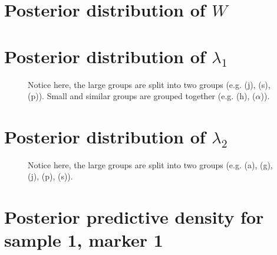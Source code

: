 \documentclass[10pt]{article} %
\begin{document}
\newpage
\section{Posterior distribution of $W$}
\begin{figure}[H]
  \begin{center}  %
  \end{center}
  \label{fig:w}
\end{figure}


\newpage
\section{Posterior distribution of $\lambda_1$}
\begin{figure}[H]
  \begin{center}  %
  \end{center}
  \caption{Notice here, the large groups are split into two groups (e.g.  (j),
  (s), (p)). Small and similar groups are grouped together (e.g.  (h),
  ($\alpha$)).}
  \label{fig:lam1}
\end{figure}

\newpage
\section{Posterior distribution of $\lambda_2$}
\begin{figure}[H]
  \begin{center}  %
  \end{center}
  \caption{Notice here, the large groups are split into two groups (e.g.  (a),
  (g), (j), (p), (s)).}
  \label{fig:lam2}
\end{figure}

\newpage
\section{Posterior predictive density for sample 1, marker 1}
\begin{figure}[H]
  \begin{center}  %
  \end{center}
  \label{fig:dd11}
\end{figure}
\end{document}
